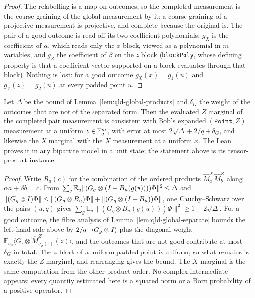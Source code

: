 \begin{proof}
\leanok
The relabelling is a map on outcomes, so the completed measurement is the coarse-graining of the
global measurement by it; a coarse-graining of a projective measurement is projective, and
complete because the original is. The pair of a good outcome is read off its two coefficient
polynomials: $g_X$ is the coefficient of $\alpha$, which reads only the $x$ block, viewed as a
polynomial in $m$ variables, and $g_Z$ the coefficient of $\beta$ on the $z$ block
(\texttt{blockPoly}, whose defining property is that a coefficient vector supported on a block
evaluates through that block). Nothing is lost: for a good outcome $g_X(x) = g_1(u)$ and
$g_Z(z) = g_2(u)$ at every padded point $u$.
\end{proof}

\begin{lemma}
\label{lem:qld-global-sandwich}
\leanok
Let $\Delta$ be the bound of Lemma~\ref{lem:qld-global-products} and $\delta_G$ the weight of the
outcomes that are not of the separated form. Then the evaluated $Z$ marginal of the completed pair
measurement is consistent with Bob's expanded $(\mathtt{Point}, Z)$ measurement at a uniform
$z \in \mathbb{F}_q^m$, with error at most $2\sqrt{\Delta} + 2/q + \delta_G$, and likewise the $X$
marginal with the $X$ measurement at a uniform $x$. The Lean proves it in any bipartite model in a
unit state; the statement above is its tensor-product instance.
\end{lemma}

\begin{proof}
\leanok
Write $B_u(c)$ for the combination of the ordered products $\widehat M^X_a \widehat M^Z_b$ along
$\alpha a + \beta b = c$. From $\sum_g \mathbb E_u \|(G_g \otimes (I - B_u(g(u))))\Phi\|^2 \leq
\Delta$ and $\|(G_g \otimes I)\Phi\| \leq \|(G_g \otimes B_u)\Phi\| +
\|(G_g \otimes (I - B_u))\Phi\|$, one Cauchy--Schwarz over the pairs $(u, g)$ gives
$\sum_g \mathbb E_u \|(G_g \otimes B_u(g(u)))\Phi\|^2 \geq 1 - 2\sqrt{\Delta}$. For a good
outcome, the fibre analysis of Lemma~\ref{lem:qld-global-separate} bounds the left-hand side
above by $2/q \cdot \langle G_g \otimes I \rangle$ plus the diagonal weight
$\mathbb E_{u_0} \langle G_g \otimes \widehat M^Z_{g_Z(z)}(z)\rangle$, and the outcomes that are
not good contribute at most $\delta_G$ in total. The $z$ block of a uniform padded point is
uniform, so what remains is exactly the $Z$ marginal, and rearranging gives the bound. The $X$
marginal is the same computation from the other product order. No complex intermediate appears:
every quantity estimated here is a squared norm or a Born probability of a positive operator.
\end{proof}

